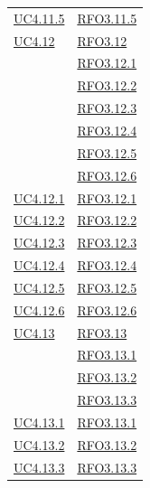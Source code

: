 \begin{longtable}{|>{\centering}m{5cm}|m{5cm}<{\centering}|}
\hyperref[UC4.11.5]{UC4.11.5} & \hyperlink{RFO3.11.5}{RFO3.11.5}\\

\hyperref[UC4.12]{UC4.12} & \hyperlink{RFO3.12}{RFO3.12}\\ & \hyperlink{RFO3.12.1}{RFO3.12.1}\\
& \hyperlink{RFO3.12.2}{RFO3.12.2}\\
& \hyperlink{RFO3.12.3}{RFO3.12.3}\\
& \hyperlink{RFO3.12.4}{RFO3.12.4}\\
& \hyperlink{RFO3.12.5}{RFO3.12.5}\\ 
& \hyperlink{RFO3.12.6}{RFO3.12.6}\\ \hline

\hyperref[UC4.12.1]{UC4.12.1} & \hyperlink{RFO3.12.1}{RFO3.12.1}\\ \hline
\hyperref[UC4.12.2]{UC4.12.2} & \hyperlink{RFO3.12.2}{RFO3.12.2}\\ \hline
\hyperref[UC4.12.3]{UC4.12.3} & \hyperlink{RFO3.12.3}{RFO3.12.3}\\ \hline
\hyperref[UC4.12.4]{UC4.12.4} & \hyperlink{RFO3.12.4}{RFO3.12.4}\\ \hline
\hyperref[UC4.12.5]{UC4.12.5} & \hyperlink{RFO3.12.5}{RFO3.12.5}\\ \hline
\hyperref[UC4.12.6]{UC4.12.6} & \hyperlink{RFO3.12.6}{RFO3.12.6}\\ \hline

\hyperref[UC4.13]{UC4.13} & \hyperlink{RFO3.13}{RFO3.13}\\ & \hyperlink{RFO3.13.1}{RFO3.13.1}\\
& \hyperlink{RFO3.13.2}{RFO3.13.2}\\
& \hyperlink{RFO3.13.3}{RFO3.13.3}\\ \hline

\hyperref[UC4.13.1]{UC4.13.1} & \hyperlink{RFO3.13.1}{RFO3.13.1}\\ \hline
\hyperref[UC4.13.2]{UC4.13.2} & \hyperlink{RFO3.13.2}{RFO3.13.2}\\ \hline
\hyperref[UC4.13.3]{UC4.13.3} & \hyperlink{RFO3.13.3}{RFO3.13.3}\\ \hline


\end{longtable}

